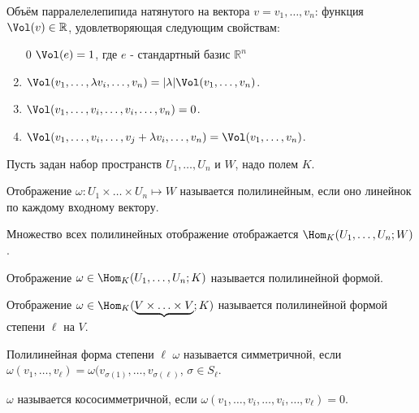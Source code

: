\begin{definition} \thmslashn 

    Объём парралелелепипида натянутого на вектора $v = v_1, \ldots, v_{n}$: функция $\Vol(v)\in \mathbb{R}$, удовлетворяющая следующим свойствам:
    \begin{enumerate}
        \item[0] $\Vol(e) = 1$, где  $e$ - стандартный базис  $\mathbb{R}^{n}$
        \item $\Vol(v_1, \ldots, \lambda v_{i}, \ldots, v_{n}) = |\lambda|\Vol(v_1, \ldots, v_{n})$.
        \item $\Vol(v_1, \ldots, v_i, \ldots, v_{i}, \ldots, v_{n}) = 0$.
        \item $\Vol(v_1, \ldots, v_{i}, \ldots, v_{j}+\lambda v_{i}, \ldots, v_{n}) = \Vol(v_1, \ldots, v_{n})$.
    \end{enumerate}
\end{definition}
\begin{definition} \thmslashn 

    Пусть задан набор пространств $U_1, \ldots, U_{n}$ и $W$, надо полем $K$.

    Отображение $\omega : U_1 \times \ldots \times U_{n} \mapsto W$ называется полилинейным, если оно линейнок по каждому входному вектору.

    Множество всех полилинейных отображение отображается $\Hom_{K}(U_1, \ldots, U_{n}; W)$.
\end{definition}
\begin{definition} \thmslashn 

    Отображение $\omega\in \Hom_{K}(U_1, \ldots, U_{n}; K)$ называется полилинейной формой.
\end{definition}
\begin{definition} \thmslashn 

    Отображение $\omega\in \Hom_{K}(\underbrace{V \times \ldots \times V}; K)$ называется полилинейной формой степени $\ell$ на $V$.
\end{definition}
\begin{definition} \thmslashn 

    Полилинейная форма степени $\ell$ $\omega$ называется симметричной, если $\omega(v_1, \ldots, v_{\ell}) = \omega(v_{\sigma(1)}, \ldots, v_{\sigma(\ell)}$, $\sigma\in S_{\ell}$.

    $\omega$ называется кососимметричной, если $\omega(v_1, \ldots, v_{i}, \ldots, v_{i}, \ldots, v_{\ell}) = 0$.
\end{definition}
